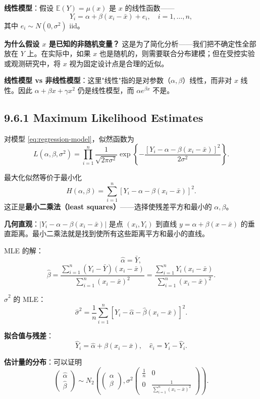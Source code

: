 \textbf{线性模型}：假设 $\mathbb{E}(Y) = \mu(x)$ 是 $x$ 的线性函数——
\[
Y_i = \alpha + \beta(x_i - \bar{x}) + e_i,\quad i = 1, \ldots, n,
\label{eq:regression-model}
\]
其中 $e_i \sim N(0, \sigma^2)$ iid。

\textbf{为什么假设 $x$ 是已知的非随机变量？} 这是为了简化分析——我们把不确定性全部放在 $Y$ 上。在实际中，如果 $x$ 也是随机的，则需要联合分布建模；但在受控实验或观测研究中，将 $x$ 视为固定设计点是合理的近似。

\textbf{线性模型 vs 非线性模型}：这里"线性"指的是对参数（$\alpha, \beta$）线性，而非对 $x$ 线性。因此 $\alpha + \beta x + \gamma x^2$ 仍是线性模型，而 $\alpha e^{\beta x}$ 不是。

\subsection{9.6.1 Maximum Likelihood Estimates}\label{sec:9.6.1}

对模型 \eqref{eq:regression-model}，似然函数为
\[
L(\alpha, \beta, \sigma^2) = \prod_{i=1}^n \frac{1}{\sqrt{2\pi\sigma^2}} \exp\left\{-\frac{[Y_i - \alpha - \beta(x_i - \bar{x})]^2}{2\sigma^2}\right\}.
\label{eq:regression-likelihood}
\]

最大化似然等价于最小化
\[
H(\alpha, \beta) = \sum_{i=1}^n [Y_i - \alpha - \beta(x_i - \bar{x})]^2.
\label{eq:regression-ls}
\]
这正是\textbf{最小二乘法（least squares）}——选择使残差平方和最小的 $\alpha, \beta$。

\textbf{几何直观}：$|Y_i - \alpha - \beta(x_i - \bar{x})|$ 是点 $(x_i, Y_i)$ 到直线 $y = \alpha + \beta(x - \bar{x})$ 的垂直距离。最小二乘法就是找到使所有这些距离平方和最小的直线。

MLE 的解：
\[
\hat{\alpha} = \bar{Y},
\label{eq:regression-alpha-hat}
\]
\[
\hat{\beta} = \frac{\sum_{i=1}^n (Y_i - \bar{Y})(x_i - \bar{x})}{\sum_{i=1}^n (x_i - \bar{x})^2}
= \frac{\sum_{i=1}^n Y_i(x_i - \bar{x})}{\sum_{i=1}^n (x_i - \bar{x})^2}.
\label{eq:regression-beta-hat}
\]

$\hat{\sigma}^2$ 的 MLE：
\[
\hat{\sigma}^2 = \frac{1}{n}\sum_{i=1}^n [Y_i - \hat{\alpha} - \hat{\beta}(x_i - \bar{x})]^2.
\label{eq:regression-sigma-hat}
\]

\textbf{拟合值与残差}：
\[
\hat{Y}_i = \hat{\alpha} + \hat{\beta}(x_i - \bar{x}),\quad
\hat{e}_i = Y_i - \hat{Y}_i.
\label{eq:regression-fitted}
\]

\textbf{估计量的分布}：可以证明
\[
\begin{pmatrix} \hat{\alpha} \\ \hat{\beta} \end{pmatrix}
\sim N_2\left(
\begin{pmatrix} \alpha \\ \beta \end{pmatrix},
\sigma^2
\begin{pmatrix}
\frac{1}{n} & 0 \\
0 & \frac{1}{\sum_{i=1}^n (x_i - \bar{x})^2}
\end{pmatrix}
\right).
\label{eq:regression-joint-dist}
\]

